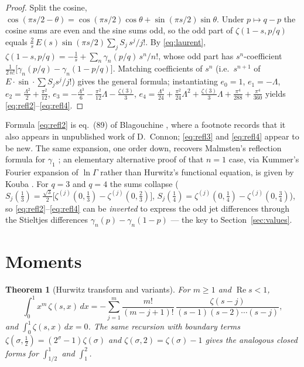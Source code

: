 \documentclass[11pt]{article}
\newtheorem{theorem}{Theorem}[section]
\theoremstyle{remark}
\begin{document}
\begin{proof}
Split the cosine, $\cos(\pi s/2-\theta)=\cos(\pi s/2)\cos\theta
+\sin(\pi s/2)\sin\theta$. Under $p\mapsto q-p$ the cosine sums are even and
the sine sums odd, so the odd part of $\zeta(1-s,p/q)$ equals
$\tfrac2s\,E(s)\sin(\pi s/2)\sum_j S_j\,s^j/j!$. By \eqref{eq:laurent},
$\zeta(1-s,p/q)=-\tfrac1s+\sum_n\gamma_n(p/q)\,s^n/n!$, whose odd part has
$s^n$-coefficient $\tfrac1{2\,n!}\bigl[\gamma_n(p/q)-\gamma_n(1-p/q)\bigr]$.
Matching coefficients of $s^{n}$ (i.e.\ $s^{n+1}$ of
$E\cdot\sin\cdot\sum S_js^j/j!$) gives the general formula; instantiating
$e_0=1$, $e_1=-\Lambda$, $e_2=\tfrac{\Lambda^2}2+\tfrac{\pi^2}{12}$,
$e_3=-\tfrac{\Lambda^3}6-\tfrac{\pi^2}{12}\Lambda-\tfrac{\zeta(3)}3$,
$e_4=\tfrac{\Lambda^4}{24}+\tfrac{\pi^2}{24}\Lambda^2+\tfrac{\zeta(3)}3\Lambda
+\tfrac{\pi^4}{288}+\tfrac{\pi^4}{360}$ yields
\eqref{eq:refl2}--\eqref{eq:refl4}.
\end{proof}

Formula \eqref{eq:refl2} is eq.~(89) of Blagouchine \cite{BlagouchineJNT},
where a footnote records that it also appears in unpublished work of
D.~Connon; \eqref{eq:refl3} and \eqref{eq:refl4} appear to be new. The same
expansion, one order down, recovers Malmsten's reflection formula for
$\gamma_1$ \cite{BlagouchineJNT}; an elementary alternative proof of that
$n=1$ case, via Kummer's Fourier expansion of $\ln\Gamma$ rather than
Hurwitz's functional equation, is given by Kouba \cite{Kouba}. For $q=3$
and $q=4$ the sums collapse
($S_j(\tfrac13)=\tfrac{\sqrt3}{2}\bigl[\zeta^{(j)}(0,\tfrac13)-\zeta^{(j)}(0,\tfrac23)\bigr]$,
$S_j(\tfrac14)=\zeta^{(j)}(0,\tfrac14)-\zeta^{(j)}(0,\tfrac34)$), so
\eqref{eq:refl2}--\eqref{eq:refl4} can be \emph{inverted} to express the odd
jet differences through the Stieltjes differences
$\gamma_n(p)-\gamma_n(1-p)$ — the key to Section~\ref{sec:values}.

\section{Moments}\label{sec:moments}

\begin{theorem}[Hurwitz transform and variants]\label{thm:transform}
For $m\ge1$ and $\operatorname{Re}s<1$,
\begin{equation}\label{eq:transform}
\int_0^1 x^m\,\zeta(s,x)\,dx
=-\sum_{j=1}^{m}\frac{m!}{(m-j+1)!}\,
\frac{\zeta(s-j)}{(s-1)(s-2)\cdots(s-j)} ,
\end{equation}
and $\int_0^1\zeta(s,x)\,dx=0$. The same recursion with boundary terms
$\zeta(\sigma,\tfrac12)=(2^\sigma-1)\zeta(\sigma)$ and
$\zeta(\sigma,2)=\zeta(\sigma)-1$ gives the analogous closed forms for
$\int_{1/2}^1$ and $\int_1^2$.
\end{theorem}
\end{document}
